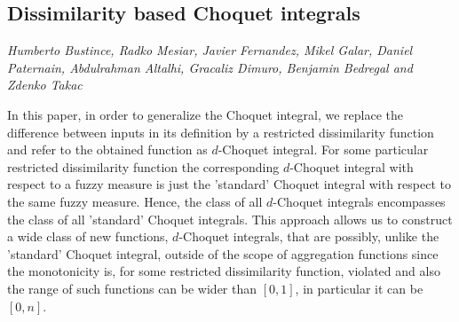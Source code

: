 \documentclass[../booklet.tex]{subfiles}
\begin{document}
\subsection[Dissimilarity based Choquet integrals. {\it Humberto Bustince, Radko Mesiar, Javier Fernandez, Mikel Galar, Daniel Paternain, Abdulrahman Altalhi, Gracaliz Dimuro, Benjamin Bedregal and Zdenko Takac}]{Dissimilarity based Choquet integrals}
        

\begin{center}
  {\it Humberto Bustince, Radko Mesiar, Javier Fernandez, Mikel Galar, Daniel Paternain, Abdulrahman Altalhi, Gracaliz Dimuro, Benjamin Bedregal and Zdenko Takac}
\end{center}

\vskip 0.8cm


In this paper, in order to generalize the Choquet integral, we replace the difference between inputs in its definition by a restricted dissimilarity function and refer to the obtained function as $d$-Choquet integral. For some particular restricted dissimilarity function the corresponding $d$-Choquet integral with respect to a fuzzy measure is just the 'standard' Choquet integral with respect to the same fuzzy measure. Hence, the class of all $d$-Choquet integrals encompasses the class of all 'standard' Choquet integrals. This approach allows us to construct a wide class of new functions, $d$-Choquet integrals, that are possibly, unlike the 'standard' Choquet integral, outside of the scope of aggregation functions since the monotonicity is, for some restricted dissimilarity function, violated and also the range of such functions can be wider than $[0,1]$, in particular it can be $[0,n]$.

\end{document}
